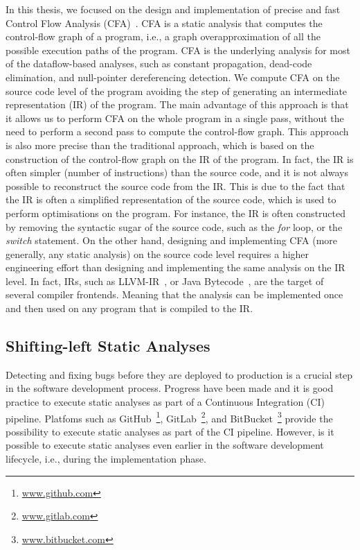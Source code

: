 In this thesis, we focused on the design and implementation of precise and fast
Control Flow Analysis (CFA)~\cite{spa}.  CFA is a static analysis that computes
the control-flow graph of a program, i.e., a graph overapproximation of all the possible
execution paths of the program. CFA is the underlying analysis for most of the dataflow-based analyses, such as
constant propagation, dead-code elimination, and null-pointer dereferencing detection.
We compute CFA on the source code level of the program avoiding the step of
generating an intermediate representation (IR) of the program. The 
main advantage of this approach is that it allows us to perform CFA on the whole program
in a single pass, without the need to perform a second pass to compute the control-flow graph.
This approach is also more precise than the traditional approach, which is based on the
construction of the control-flow graph on the IR of the program. In fact, the IR is often
simpler (number of instructions) than the source code, and it is not always possible to reconstruct the source code
from the IR. This is due to the fact that the IR is often a simplified representation of the source code,
which is used to perform optimisations on the program. For instance, the IR is often
constructed by removing the syntactic sugar of the source code, such as the \emph{for} loop, 
or the \emph{switch} statement.
On the other hand, designing and implementing CFA (more generally, any static analysis) on the source code level
requires a higher engineering effort than designing and implementing the same analysis on the IR level.
In fact, IRs, such as LLVM-IR~\cite{LLVM}, or Java Bytecode~\cite{javaBytecode}, are 
the target of several compiler frontends. Meaning that the analysis can be implemented once
and then used on any program that is compiled to the IR.




\subsection{Shifting-left Static Analyses}
Detecting and fixing bugs before they are deployed to production is a crucial 
step in the software development process. Progress have been made and it is 
good practice to execute static analyses as part of a Continuous Integration (CI) pipeline.
Platfoms such as GitHub~\footnote{\url{www.github.com}}, GitLab~\footnote{\url{www.gitlab.com}}, and BitBucket~\footnote{\url{www.bitbucket.com}}
provide the possibility to execute static analyses as part of the CI pipeline. 
However, is it possible to execute static analyses even earlier in the software development lifecycle, 
i.e., during the implementation phase.



